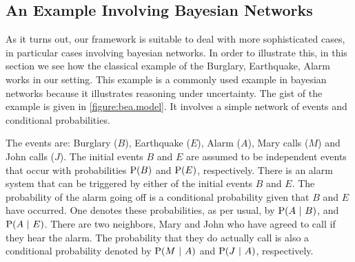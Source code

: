 \documentclass{tlp}
\renewcommand{\cite}{\citep}
\newcommand{\at}[1]{\ensuremath{\!\del{#1}}}        %
\newcommand{\prfunc}{\ensuremath{\mathrm{P}}}
\newcommand{\pr}[1]{\ensuremath{\prfunc\at{#1}}}
\newcommand{\given}{\ensuremath{~\middle|~}}
\begin{document}
\subsection{An Example Involving Bayesian Networks}\label{subsec:example.bayesian.networks}
%
%
%
As it turns out, our framework is suitable to deal with more
sophisticated cases, in particular cases involving bayesian networks.
In order to illustrate this, in this section we see how the classical
example of the Burglary, Earthquake, Alarm \cite{judea88probabilistic} works in our
setting.  This example is a commonly used example in bayesian networks
because it illustrates reasoning under uncertainty.  The gist of the
example is given in \cref{figure:bea.model}.  It involves a simple network
of events and conditional probabilities.

The events are: Burglary (\(B\)), Earthquake (\(E\)), Alarm (\(A\)),
Mary calls (\(M\)) and John calls (\(J\)).  The initial events \(B\)
and \(E\) are assumed to be independent events that occur with
probabilities \(\pr{B}\) and \(\pr{E}\), respectively.  There is an
alarm system that can be triggered by either of the initial events
\(B\) and \(E\).  The probability of the alarm going off is a
conditional probability given that \(B\) and \(E\) have occurred.  One
denotes these probabilities, as per usual, by \(\pr{A \given B}\), and
\(\pr{A \given E}\).  There are two neighbors, Mary and John who have
agreed to call if they hear the alarm.  The probability that they do
actually call is also a conditional probability denoted by
\(\pr{M \given A}\) and \(\pr{J \given A}\), respectively.
\end{document}
